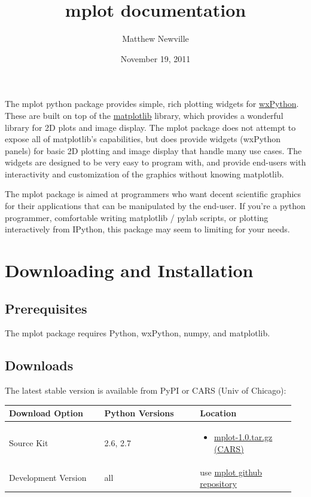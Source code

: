 \documentclass[letterpaper,10pt,english]{sphinxmanual}
\title{mplot documentation}
\date{November 19, 2011}
\author{Matthew Newville}
\begin{document}
\maketitle
\tableofcontents
{}\label{index::doc}


The mplot python package provides simple, rich plotting widgets for
\href{http://www.wxpython.org/}{wxPython}.  These are built on top of the \href{http://matplotlib.sourceforge.net/}{matplotlib} library, which
provides a wonderful library for 2D plots and image display.  The mplot
package does not attempt to expose all of matplotlib's capabilities, but
does provide widgets (wxPython panels) for basic 2D plotting and image
display that handle many use cases.  The widgets are designed to be very
easy to program with, and provide end-users with interactivity and
customization of the graphics without knowing matplotlib.

The mplot package is aimed at programmers who want decent scientific
graphics for their applications that can be manipulated by the end-user.
If you're a python programmer, comfortable writing matplotlib / pylab
scripts, or plotting interactively from IPython, this package may seem to
limiting for your needs.


\chapter{Downloading and Installation}
\label{installation:downloading-and-installation}\label{installation::doc}\label{installation:mplot-simple-rich-plotting-widgets-for-wxpython-using-matplotlib}

\section{Prerequisites}
\label{installation:prerequisites}
The mplot package requires Python, wxPython, numpy, and matplotlib.


\section{Downloads}
\label{installation:downloads}
The latest stable version is available from PyPI or CARS (Univ of Chicago):

\begin{tabular}{|p{0.317\linewidth}|p{0.317\linewidth}|p{0.317\linewidth}|}
\hline
\textbf{
Download Option
} & \textbf{
Python Versions
} & \textbf{
Location
}\\
\hline

Source Kit
 & 
2.6, 2.7
 & \begin{itemize}
\item {} 
\href{http://cars9.uchicago.edu/software/mplot/src/mplot-1.0.tar.gz}{mplot-1.0.tar.gz (CARS)}

\end{itemize}
\\

Development Version
 & 
all
 & 
use \href{http://github.com/newville/mplot}{mplot github repository}
\\
\hline
\end{tabular}
\end{document}
